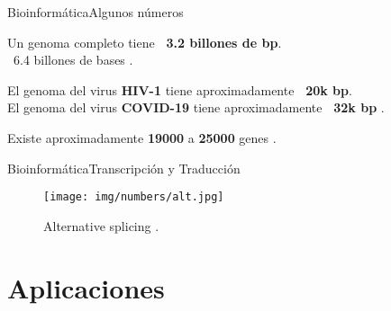 \documentclass[10pt]{beamer}
\newcommand{\1}{
        	\setbeamertemplate{background}{
        		\texttt{[image: img/1]}
        		\tikz[overlay] \fill[fill opacity=0.75,fill=white] (0,0) rectangle (-\paperwidth,\paperheight);
        	}
}
\begin{document}
\begin{frame}{Bioinformática}{Algunos números}
	
	\begin{block}{}
		\centering
		Un genoma completo tiene \textbf{\string ~3.2 billones de bp}. \\
		\string ~6.4 billones de bases \cite{archibald2018genomics}.
	\end{block}
	
	\pause
	\begin{block}{}
		\centering
		El genoma del virus \textbf{HIV-1} tiene aproximadamente \textbf{\string ~20k bp}. \\
		El genoma del virus \textbf{COVID-19} tiene aproximadamente \textbf{\string ~32k bp} \cite{randhawa2020machine}.
	\end{block}
	
	\pause
	\begin{block}{}
		\centering
		Existe aproximadamente \textbf{19000} a \textbf{25000} genes \cite{archibald2018genomics}.
	\end{block}
	
\end{frame}

\begin{frame}{Bioinformática}{Transcripción y Traducción}
	\begin{figure}[]
		\centering
		\texttt{[image: img/numbers/alt.jpg]}
		\caption{Alternative splicing \cite{genbio2020}.}
	\end{figure}
\end{frame}



\section{Aplicaciones}
\end{document}
